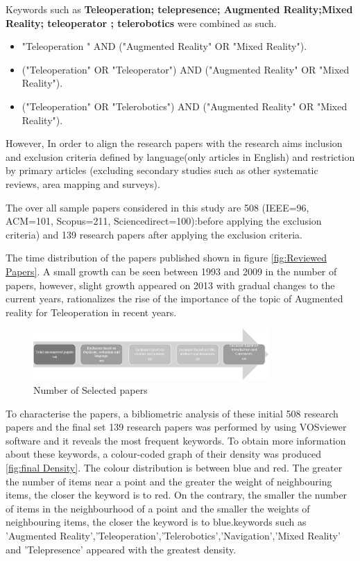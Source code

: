 Keywords such as \textbf{Teleoperation; telepresence; Augmented Reality;Mixed Reality; teleoperator ; telerobotics} were combined as such.
\begin{itemize}
    \item "Teleoperation " AND ("Augmented Reality" OR "Mixed Reality").
    \item ("Teleoperation" OR "Teleoperator") AND ("Augmented Reality" OR "Mixed Reality").
    \item ("Teleoperation" OR "Telerobotics") AND ("Augmented Reality" OR "Mixed Reality").
\end{itemize}

However, In order to align the research papers with the research aims inclusion and exclusion criteria  defined by language(only articles in English) and restriction by primary articles (excluding secondary studies such as other systematic reviews, area mapping and surveys).

The over all sample papers considered in this study are 508 (IEEE=96, ACM=101, Scopus=211, Sciencedirect=100):before applying the exclusion criteria) and 139 research papers after applying the exclusion criteria.

The time distribution of the papers published shown in figure \ref{fig:Reviewed Papers}. A small growth can be seen between 1993 and 2009 in the number of papers, however, slight growth appeared on 2013 with gradual changes to the current years, rationalizes the rise of the importance of the topic of Augmented reality for Teleoperation in recent years.

\begin{figure}[h]
    \centering
    \includegraphics[width=0.8\textwidth]{images/Selected_papers.png}
    \caption{Number of Selected papers}
    \label{fig:PapersNumber}
\end{figure}

To characterise the papers, a bibliometric analysis of these initial 508 research papers and the final set 139 research papers was performed by using VOSviewer software and it reveals the most frequent keywords. To obtain more information about these keywords, a colour-coded graph of their density was produced \ref{fig:final Density}. The colour distribution is between blue and red. The greater the number of items near a point and the greater the weight of neighbouring items, the closer the keyword is to red. On the contrary, the smaller the number of items in the neighbourhood of a point and the smaller the weights of neighbouring items, the closer the keyword is to blue.keywords such as 'Augmented Reality','Teleoperation','Telerobotics','Navigation','Mixed Reality' and 'Telepresence' appeared with the greatest density.


